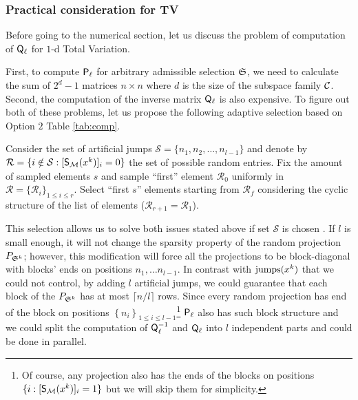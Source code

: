 \subsubsection{Practical consideration for TV}
{
Before going to the numerical section, let us discuss the problem of computation of ${\mathsf{Q}}_\ell$ for $1$-d Total Variation.

First, to compute ${\mathsf{P}}_\ell$ for arbitrary admissible selection $\mathfrak{S}$, we need to calculate the sum of $2^d - 1$ matrices $n\times n$ where $d$ is the size of the subspace family $\mathcal{C}$. Second, the computation of the inverse matrix ${\mathsf{Q}}_\ell$ is also expensive. To figure out both of these problems, let us propose the following adaptive selection based on Option $2$ Table \ref{tab:comp}.

Consider the set of artificial jumps  $\mathcal{S} = \{n_1, n_2, \ldots, n_{l-1}\}$ and denote by $\mathcal{R} = \{i\notin \mathcal{S}: [\mathsf{S}_{\mathcal{M}}(x^k)]_i=0\}$ the set of possible random entries. Fix the amount of sampled elements $s$ and sample ``first'' element $\mathcal{R}_0$ uniformly in $\mathcal{R} = \{\mathcal{R}_i\}_{1\leq i\leq r}$. Select ``first $s$'' elements starting from $\mathcal{R}_f$ considering the cyclic structure of the list of elements ($\mathcal{R}_{r+1} = \mathcal{R}_1$). 

This selection allows us to solve both issues stated above if set $\mathcal{S}$ is chosen . If $l$ is small enough, it will not change the sparsity property of the random projection $P_{\mathfrak{S}^k}$; however, this modification will force all the projections to be block-diagonal with blocks' ends on positions $n_1,\ldots n_{l-1}$. In contrast with $\mathrm{jumps}(x^k)$ that we could not control, by adding $l$ artificial jumps, we could guarantee that each block of the $P_{\mathfrak{S}^k}$ has at most $\lceil n/l\rceil$ rows. Since every random projection has end of the block on positions $\left\{n_i\right\}_{1\leq i \leq l -1}$\footnote{Of course, any projection also has the ends of the blocks on positions $\{i:[\mathsf{S}_{\mathcal{M}}(x^k)]_i = 1\}$ but we will skip them for simplicity.} ${\mathsf{P}}_\ell$ also has such block structure and we could split the computation of ${\mathsf{Q}}_\ell^{-1}$ and ${\mathsf{Q}}_\ell$ into $l$ independent parts and could be done in parallel.

}
